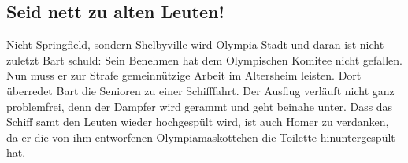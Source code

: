 
	
\subsection{Seid nett zu alten Leuten!}\label{AABF16}
Nicht Springfield, sondern Shelbyville wird Olympia-Stadt und daran ist nicht zuletzt Bart schuld: Sein Benehmen hat dem Olympischen Komitee nicht gefallen. Nun muss er zur Strafe gemeinnützige Arbeit im Altersheim leisten. Dort überredet Bart die Senioren zu einer Schifffahrt. Der Ausflug verläuft nicht ganz problemfrei, denn der Dampfer wird gerammt und geht beinahe unter. Dass das Schiff samt den Leuten wieder hochgespült wird, ist auch Homer zu verdanken, da er die von ihm entworfenen Olympiamaskottchen die Toilette hinuntergespült hat.

